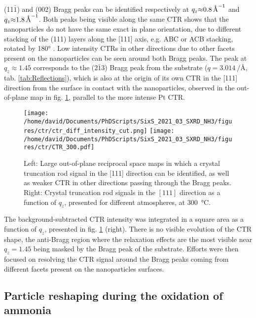 (11$\bar{1}$) and (002) Bragg peaks can be identified respectively at $q_z \qty{\approx0.8}{\per\angstrom}$ and $q_z \qty{\approx1.8}{\per\angstrom}$.
Both peaks being visible along the same CTR shows that the nanoparticles do not have the same exact in plane orientation, due to different stacking of the (111) layers along the [111] axis, e.g. ABC or ACB stacking, rotated by \ang{180} \parencite{Jones2019}.
Low intensity CTRs in other directions due to other facets present on the nanoparticles can be seen around both Bragg peaks.
The peak at $q_z\approx1.45$ corresponds to the (2$\bar{1}$3) Bragg peak from the  substrate ($q = \qty{3.014}{\per\angstrom}$, tab. \ref{tab:Reflections}), which is also at the origin of its own CTR in the [111] direction from the surface in contact with the nanoparticles, observed in the out-of-plane map in fig. \ref{fig:2DCTR111Particles}, parallel to the more intense Pt CTR.

\begin{figure}[!htb]
    \centering
    \texttt{[image: /home/david/Documents/PhDScripts/SixS\_2021\_03\_SXRD\_NH3/figures/ctr/ctr\_diff\_intensity\_cut.png]}
    \texttt{[image: /home/david/Documents/PhDScripts/SixS\_2021\_03\_SXRD\_NH3/figures/ctr/CTR\_300.pdf]}
    \caption{
        Left: Large out-of-plane reciprocal space maps in which a crystal truncation rod signal in the [111] direction can be identified, as well as weaker CTR in other directions passing through the Bragg peaks.
        Right: Crystal truncation rod signals in the $[111]$ direction as a function of $q_z$, presented for different atmospheres, at \qty{300}{\degreeCelsius}.
    }
    \label{fig:2DCTR111Particles}
\end{figure}

The background-subtracted CTR intensity was integrated in a square area as a function of $q_z$, presented in fig. \ref{fig:2DCTR111Particles} (right).
There is no visible evolution of the CTR shape, the anti-Bragg region where the relaxation effects are the most visible near $q_z=1.45$ being masked by the Bragg peak of the substrate.
Efforts were then focused on resolving the CTR signal around the Bragg peaks coming from different facets present on the nanoparticles surfaces.

\subsection{Particle reshaping during the oxidation of ammonia}

